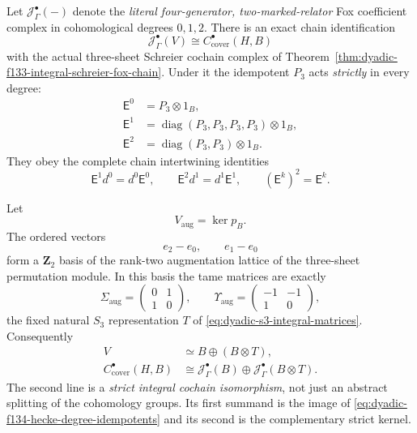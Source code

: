 \begin{theorem}
Let $\mathcal J_\Gamma^\bullet(-)$
denote the \emph{literal
four-generator,
two-marked-relator}
Fox coefficient complex
in cohomological degrees
$0,1,2$.  There is an
exact chain identification
\begin{equation}\label{eq:dyadic-f134-coinduced-cover-equality}
\boxed{\quad
\mathcal J_\Gamma^\bullet(V)
\cong
C_{\mathrm{cover}}^\bullet(H,B)
\quad}
\end{equation}
with the actual
three-sheet Schreier
cochain complex of
Theorem~\ref{thm:dyadic-f133-integral-schreier-fox-chain}.
Under it the
idempotent $P_3$
acts \emph{strictly}
in every degree:
\begin{equation}\label{eq:dyadic-f134-hecke-degree-idempotents}
\boxed{
\begin{aligned}
\mathsf E^0&=P_3\otimes 1_B,\\
\mathsf E^1&=\operatorname{diag}
(P_3,P_3,P_3,P_3)\otimes1_B,\\
\mathsf E^2&=\operatorname{diag}
(P_3,P_3)\otimes1_B.
\end{aligned}}
\end{equation}
They obey the
complete chain
intertwining
identities
\begin{equation}\label{eq:dyadic-f134-strict-hecke-chain}
\boxed{\quad
\mathsf E^1d^0=d^0\mathsf E^0,
\qquad
\mathsf E^2d^1=d^1\mathsf E^1,
\qquad
(\mathsf E^k)^2=\mathsf E^k.
\quad}
\end{equation}

Let
\[
V_{\mathrm{aug}}=\ker p_B.
\]
The ordered vectors
\begin{equation}\label{eq:dyadic-f134-two-augmentation-cosets}
e_2-e_0,\qquad e_1-e_0
\end{equation}
form a $\mathbf Z_2$
basis of the
rank-two
augmentation
lattice of the
three-sheet
permutation module.
In this basis the
tame matrices are
exactly
\[
\Sigma_{\mathrm{aug}}
=\begin{pmatrix}0&1\\1&0\end{pmatrix},
\qquad
\Upsilon_{\mathrm{aug}}
=\begin{pmatrix}-1&-1\\1&0\end{pmatrix},
\]
the fixed natural
$S_3$ representation
$T$ of
\eqref{eq:dyadic-s3-integral-matrices}.
Consequently
\begin{equation}\label{eq:dyadic-f134-universal-coinduced-split}
\boxed{
\begin{aligned}
V&\simeq B\oplus(B\otimes T),\\
C_{\mathrm{cover}}^\bullet(H,B)
&\cong
\mathcal J_\Gamma^\bullet(B)
\oplus
\mathcal J_\Gamma^\bullet(B\otimes T).
\end{aligned}}
\end{equation}
The second line is a
\emph{strict integral
cochain isomorphism},
not just an abstract
splitting of the
cohomology groups.
Its first summand is
the image of
\eqref{eq:dyadic-f134-hecke-degree-idempotents}
and its second is
the complementary
strict kernel.


\end{theorem}
